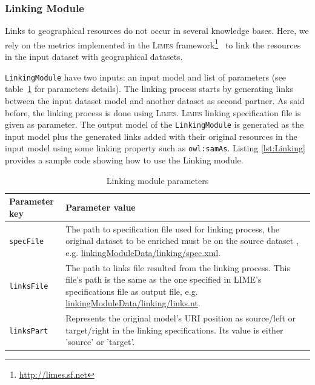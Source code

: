 \documentclass[a4paper,twoside,bibtotoc,abstracton,12pt,BCOR=15mm]{article}
\newcommand{\limes}{\textsc{Limes}\xspace}
\begin{document}
    \subsubsection{Linking Module}
    Links to geographical resources do not occur in several knowledge bases.
    Here, we rely on the metrics implemented in the \limes framework\footnote{\url{http://limes.sf.net}}~\cite{NGAU11,NGON12c,NGO+13c} to link the resources in the input dataset with geographical datasets.
  
    \texttt{LinkingModule} have two inputs: an input model and list of parameters (see table~\ref{tbl:linkingPram} for parameters details).
    The linking process starts by generating links between the input dataset model and another dataset as second partner. 
    As said before, the linking process is done using \limes.
    \limes linking specification file is given as parameter.
    The output model of the \texttt{LinkingModule} is generated as the input model plus the generated links added with their original resources in the input model using    some linking property such as \texttt{owl:samAs}.
    Listing \ref{lst:Linking} provides a sample code showing how to use the Linking module.

    \begin{table}
    \caption{Linking module parameters} \label{tbl:linkingPram}
    \small
    \begin{tabularx}{\textwidth}{@{}lX@{}}
    \toprule
    \textbf{Parameter key} 	&  \textbf{Parameter value}\\
    \toprule
    \texttt{specFile}	& The path to specification file used for linking process, the original dataset to be enriched must be on the source dataset , e.g. \url {linkingModuleData/linking/spec.xml}.\\
    \midrule
    \texttt{linksFile}	& The path to links file resulted from the linking process. This file's path is the same as the one specified in LIME's specifications file as output file, e.g. \url {linkingModuleData/linking/links.nt}.\\
    \midrule
    \texttt{linksPart} 	& Represents the original model's URI position as source/left or target/right in the linking specifications. Its value is either 'source' or 'target'.\\ 
    \bottomrule
    \end{tabularx}
    \end{table}
\end{document}
